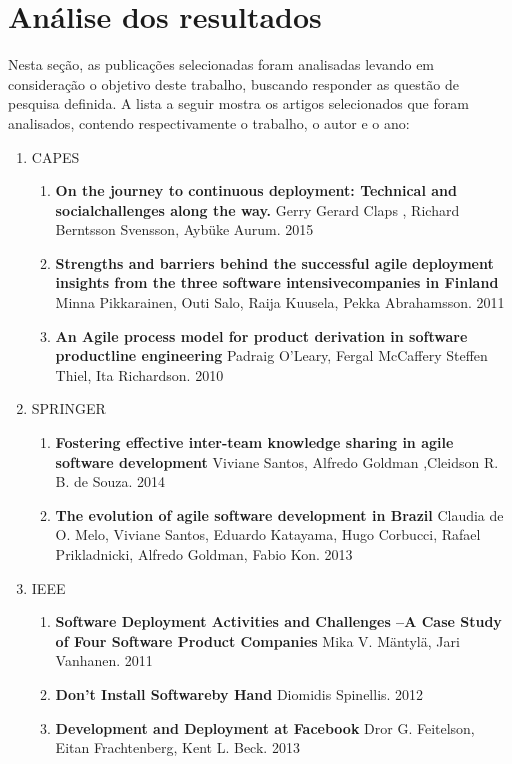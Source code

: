 \documentclass[12pt]{article}
\begin{document}
\section{Análise dos resultados} \label{sec5}

Nesta  seção,  as  publicações  selecionadas  foram  analisadas  levando  em  consideração  o 
objetivo deste trabalho, buscando responder as questão de pesquisa definida. A lista a seguir mostra os artigos selecionados que foram analisados, contendo respectivamente o trabalho, o autor e o ano:

\begin{enumerate}
  \item CAPES
  	\begin{enumerate}
    	\item \textbf{On the journey to continuous deployment: Technical and socialchallenges along the way.}  Gerry Gerard Claps , Richard Berntsson Svensson, Aybüke Aurum. 2015 
    	\item \textbf{Strengths and barriers behind the successful agile deployment insights from the three software intensivecompanies in Finland} Minna Pikkarainen, Outi Salo, Raija Kuusela, Pekka Abrahamsson. 2011
        \item \textbf{An Agile process model for product derivation in software productline engineering} Padraig O’Leary, Fergal McCaffery Steffen Thiel, Ita Richardson. 2010
  	\end{enumerate}
  \item SPRINGER
  	\begin{enumerate}
    	\item \textbf{Fostering effective inter-team knowledge sharing in agile software development} Viviane Santos, Alfredo Goldman ,Cleidson R. B. de Souza.  2014
    	\item \textbf{The evolution of agile software development in Brazil} Claudia de O. Melo, Viviane Santos, Eduardo Katayama, Hugo Corbucci, Rafael Prikladnicki, Alfredo Goldman, Fabio Kon.  2013
  	\end{enumerate}
  \item IEEE
  	\begin{enumerate}
    	\item \textbf{Software Deployment Activities and Challenges –A Case Study of Four Software Product Companies} Mika V. Mäntylä, Jari Vanhanen. 2011
    	\item \textbf{Don’t Install Softwareby Hand} Diomidis Spinellis. 2012
    	\item \textbf{Development and Deployment at Facebook } Dror G. Feitelson, Eitan Frachtenberg, Kent L. Beck.  2013

\end{enumerate}
\end{enumerate}
\end{document}
